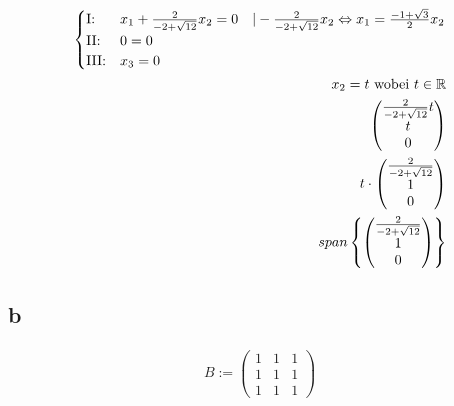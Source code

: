 \begin{align*}
    \begin{cases}
        \text{I:\@} & x_1 + \frac{2}{-2 + \sqrt{12}}x_2 = 0 \quad |- \frac{2}{-2 + \sqrt{12}}x_2 \Leftrightarrow x_1 =  \frac{-1+\sqrt{3}}{2}x_2  \\
        \text{II:\@} & 0 = 0 \\
        \text{III:\@} & x_3 = 0
    \end{cases} \\
    x_2 = t \text{ wobei } t \in \mathbb{R}\\
    \begin{pmatrix}
        \frac{2}{-2 + \sqrt{12}}t \\
        t \\
        0
    \end{pmatrix} \\
    t \cdot \begin{pmatrix}
        \frac{2}{-2 + \sqrt{12}} \\
        1 \\
        0
    \end{pmatrix} \\
    span \left\{\begin{pmatrix}
        \frac{2}{-2 + \sqrt{12}} \\
        1 \\
        0
    \end{pmatrix}\right\}
\end{align*}

\subsection{b}

\begin{align*}
    B := \begin{pmatrix}
        1 & 1 & 1 \\
        1 & 1 & 1 \\
        1 & 1 & 1
    \end{pmatrix}
\end{align*}

